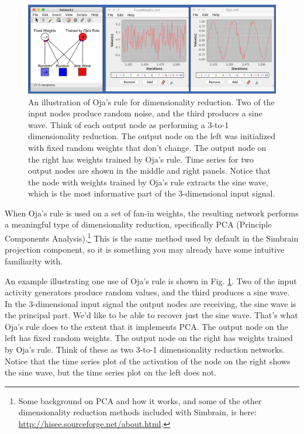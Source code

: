 \begin{figure}[h]
\centering
\includegraphics[scale=.4]{./images/OjasRule.png}
\caption[Simbrain screenshot]{An illustration of Oja's rule for dimensionality reduction. Two of the input nodes produce random noise, and the third produces a sine wave. Think of each output node as performing a 3-to-1 dimensionality reduction. The output node on the left was initialized with fixed random weights that don't change. The output node on the right has weights trained by Oja's rule. Time series for two output nodes are shown in the middle and right panels. Notice that the node with weights trained by Oja's rule extracts the sine wave, which is the most informative part of the 3-dimensional input signal.}
\label{oja_dim_reduction}
\end{figure}

When Oja's rule is used on a set of fan-in weights, the resulting network performs a meaningful type of dimensionality reduction, specifically PCA (Principle Components Analysis).\footnote{Some background on PCA and how it works, and some of the other dimensionality reduction methods included with Simbrain, is here: \url{http://hisee.sourceforge.net/about.html}.}   This is the same method used by default in the Simbrain projection component, so it is something you may already have some intuitive familiarity with. 

An example illustrating one use of Oja's rule is shown in Fig. \ref{oja_dim_reduction}. Two of the input activity generators produce random values, and the third produces a sine wave. In the 3-dimensional input signal the output nodes are receiving, the sine wave is the principal part. We'd like to be able to recover just the sine wave. That's what Oja's rule does to the extent that it implements PCA. The output node on the left has fixed random weights. The output node on the right has weights trained by Oja's rule. Think of these as two 3-to-1 dimensionality reduction networks. Notice that the time series plot of the activation of the node on the right shows the sine wave, but the time series plot on the left does not.


